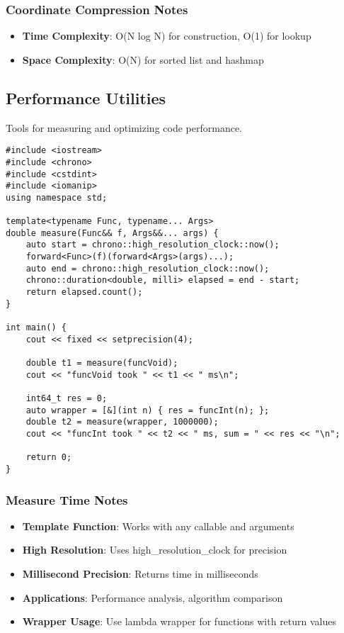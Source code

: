 \documentclass[11pt,a4paper]{article}
\begin{document}
\subsubsection{Coordinate Compression Notes}
\begin{itemize}
\item \textbf{Time Complexity}: O(N log N) for construction, O(1) for lookup
\item \textbf{Space Complexity}: O(N) for sorted list and hashmap
\end{itemize}

\newpage
\subsection{Performance Utilities}
Tools for measuring and optimizing code performance.

\begin{lstlisting}[caption={Measure Time Utility}]
#include <iostream>
#include <chrono>
#include <cstdint>
#include <iomanip>  
using namespace std;

template<typename Func, typename... Args>
double measure(Func&& f, Args&&... args) {
    auto start = chrono::high_resolution_clock::now();
    forward<Func>(f)(forward<Args>(args)...);
    auto end = chrono::high_resolution_clock::now();
    chrono::duration<double, milli> elapsed = end - start;
    return elapsed.count();
}

int main() {
    cout << fixed << setprecision(4);

    double t1 = measure(funcVoid);
    cout << "funcVoid took " << t1 << " ms\n";

    int64_t res = 0;
    auto wrapper = [&](int n) { res = funcInt(n); };
    double t2 = measure(wrapper, 1000000);
    cout << "funcInt took " << t2 << " ms, sum = " << res << "\n";

    return 0;
}
\end{lstlisting}

\subsubsection{Measure Time Notes}
\begin{itemize}
\item \textbf{Template Function}: Works with any callable and arguments
\item \textbf{High Resolution}: Uses high\_resolution\_clock for precision
\item \textbf{Millisecond Precision}: Returns time in milliseconds
\item \textbf{Applications}: Performance analysis, algorithm comparison
\item \textbf{Wrapper Usage}: Use lambda wrapper for functions with return values
\end{itemize}
\end{document}

